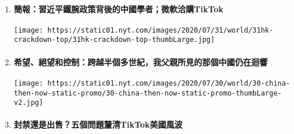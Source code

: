 \begin{enumerate}
\def\labelenumi{\arabic{enumi}.}
\item
  \href{https://cn.nytimes.com/morning-brief/20200803/tiktok-hong-kong-national-security-law-spacex/zh-hant/?utm_source=top10-in-article\&utm_medium=articlepage\&utm_campaign=web}{}

  \hypertarget{ux7c21ux5831ux7fd2ux8fd1ux5e73ux9435ux8155ux653fux7b56ux80ccux5f8cux7684ux4e2dux570bux5b78ux8005ux5faeux8edfux6d3dux8cfctiktok}{%
  \paragraph{簡報：習近平鐵腕政策背後的中國學者；微軟洽購TikTok}\label{ux7c21ux5831ux7fd2ux8fd1ux5e73ux9435ux8155ux653fux7b56ux80ccux5f8cux7684ux4e2dux570bux5b78ux8005ux5faeux8edfux6d3dux8cfctiktok}}

  \texttt{[image: https://static01.nyt.com/images/2020/07/31/world/31hk-crackdown-top/31hk-crackdown-top-thumbLarge.jpg]}
\item
  \href{https://cn.nytimes.com/china/20200731/china-1950s-echoed-today/zh-hant/?utm_source=top10-in-article\&utm_medium=articlepage\&utm_campaign=web}{}

  \hypertarget{ux5e0cux671bux7d55ux671bux548cux63a7ux5236ux8de8ux8d8aux534aux500bux591aux4e16ux7d00ux6211ux7236ux89aaux6240ux898bux7684ux90a3ux500bux4e2dux570bux4ecdux5728ux8ff4ux97ff}{%
  \paragraph{希望、絕望和控制：跨越半個多世紀，我父親所見的那個中國仍在迴響}\label{ux5e0cux671bux7d55ux671bux548cux63a7ux5236ux8de8ux8d8aux534aux500bux591aux4e16ux7d00ux6211ux7236ux89aaux6240ux898bux7684ux90a3ux500bux4e2dux570bux4ecdux5728ux8ff4ux97ff}}

  \texttt{[image: https://static01.nyt.com/images/2020/07/30/world/30-china-then-now-static-promo/30-china-then-now-static-promo-thumbLarge-v2.jpg]}
\item
  \href{https://cn.nytimes.com/technology/20200803/tiktok-trump-microsoft-bytedance-china-ban/zh-hant/?utm_source=top10-in-article\&utm_medium=articlepage\&utm_campaign=web}{}

  \hypertarget{ux5c01ux7981ux9084ux662fux51faux552eux4e94ux500bux554fux984cux91d0ux6e05tiktokux7f8eux570bux98a8ux6ce2}{%
  \paragraph{封禁還是出售？五個問題釐清TikTok美國風波}\label{ux5c01ux7981ux9084ux662fux51faux552eux4e94ux500bux554fux984cux91d0ux6e05tiktokux7f8eux570bux98a8ux6ce2}}


\end{enumerate}
